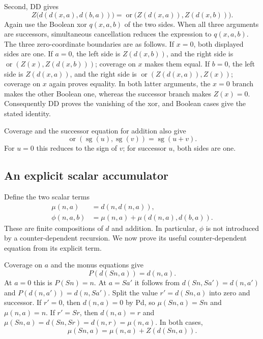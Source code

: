 \documentclass[11pt]{article}
\theoremstyle{definition}\newtheorem{definition}[theorem]{Definition}
\begin{document}
Second, DD gives
\[
 Z\bigl(d(d(x,a),d(b,a))\bigr)
 =\operatorname{or}\bigl(Z(d(x,a)),Z(d(x,b))\bigr).
 \tag{B2}\label{eq:ur-comparison-join}
\]
Again use the Boolean xor $q(x,a,b)$ of the two sides.
When all three arguments are successors, simultaneous cancellation
reduces the expression to $q(x,a,b)$.
The three zero-coordinate boundaries are as follows.
If $x=0$, both displayed sides are one.
If $a=0$, the left side is $Z(d(x,b))$, and the right side is
$\operatorname{or}(Z(x),Z(d(x,b)))$; coverage on $x$ makes them equal.
If $b=0$, the left side is $Z(d(x,a))$, and the right side is
$\operatorname{or}(Z(d(x,a)),Z(x))$; coverage on $x$ again proves equality.
In both latter arguments, the $x=0$ branch makes the other Boolean one,
whereas the successor branch makes $Z(x)=0$.
Consequently DD proves the vanishing of the xor, and Boolean cases
give the stated identity.

Coverage and the successor equation for addition also give
\[
 \operatorname{or}(\operatorname{sg}(u),\operatorname{sg}(v))
       =\operatorname{sg}(u+v).
 \tag{B3}\label{eq:ur-sign-or}
\]
For $u=0$ this reduces to the sign of $v$; for successor $u$, both
sides are one.

\subsection{An explicit scalar accumulator}

Define the two scalar terms
\begin{equation}
\begin{aligned}
 \mu(n,a)&=d(n,d(n,a)),\\
 \phi(n,a,b)&=\mu(n,a)+\mu(d(n,a),d(b,a)).
\end{aligned}
 \label{eq:ur-scalar-accumulator}
\end{equation}
These are finite compositions of $d$ and addition. In particular,
$\phi$ is not introduced by a counter-dependent recursion.
We now prove its useful counter-dependent equation from its explicit term.

Coverage on $a$ and the monus equations give
\[
                         P(d(Sn,a))=d(n,a).
 \tag{Pd}
\]
At $a=0$ this is $P(Sn)=n$. At $a=Sa'$ it follows from
$d(Sn,Sa')=d(n,a')$ and $P(d(n,a'))=d(n,Sa')$.
Split the value $r'=d(Sn,a)$ into zero and successor.
If $r'=0$, then $d(n,a)=0$ by Pd, so
$\mu(Sn,a)=Sn$ and $\mu(n,a)=n$.
If $r'=Sr$, then $d(n,a)=r$ and
$\mu(Sn,a)=d(Sn,Sr)=d(n,r)=\mu(n,a)$.
In both cases,
\[
             \mu(Sn,a)=\mu(n,a)+Z(d(Sn,a)).              \tag{M}
\]
\end{document}
